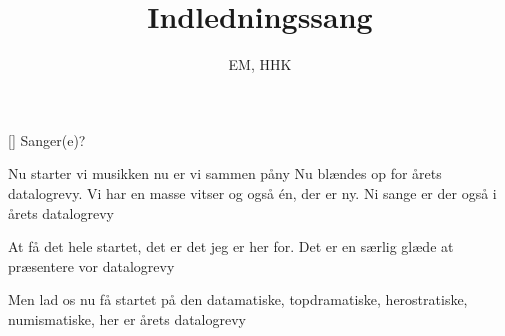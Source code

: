\documentclass[a4paper,11pt]{article}
\title{Indledningssang}
\author{EM, HHK}
\begin{document}
\maketitle

\begin{roles}
  [] Sanger(e)?
\end{roles}

\begin{song}

  Nu starter vi musikken
  nu er vi sammen påny
  Nu blændes op for årets
  datalogrevy.
  Vi har en masse vitser
  og også én, der er ny.
  Ni sange er der også i årets
  datalogrevy


  At få det hele startet,
  det er det jeg er her for.
  Det er en særlig glæde
  at præsentere vor
  datalogrevy


  Men lad os nu få startet
  på den datamatiske,
  topdramatiske, herostratiske,
  numismatiske,
  her er årets datalogrevy
\end{song}
\end{document}
